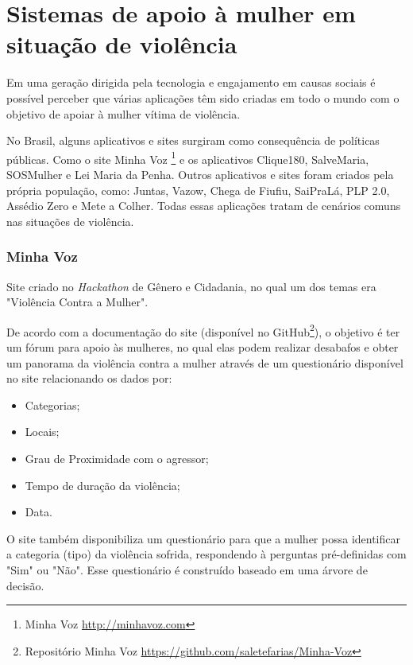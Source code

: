 \chapter{Sistemas de apoio à mulher em situação de violência} \label{cap:sistemas_relacionados}

Em uma geração dirigida pela tecnologia e engajamento em causas sociais é possível perceber que várias aplicações têm sido criadas em todo o mundo com o objetivo de apoiar à mulher vítima de violência.

No Brasil, alguns aplicativos e sites surgiram como consequência de políticas públicas. Como o site Minha Voz \footnote{Minha Voz \url{http://minhavoz.com}} e os aplicativos Clique180, SalveMaria, SOSMulher e Lei Maria da Penha. Outros aplicativos e sites foram criados pela própria população, como: Juntas, Vazow, Chega de Fiufiu, 
SaiPraLá, PLP 2.0, Assédio Zero e Mete a Colher. Todas essas aplicações tratam de cenários comuns nas situações de 
violência.

\subsection*{Minha Voz}

Site criado no \textit{Hackathon} de Gênero e Cidadania, no qual
um dos temas era "Violência Contra a Mulher". 

De acordo com a documentação do site (disponível no GitHub\footnote{Repositório Minha Voz \url{https://github.com/saletefarias/Minha-Voz}}), o objetivo é ter um fórum para apoio às mulheres, no qual elas podem
realizar desabafos e obter um panorama da violência contra a mulher através de um questionário
disponível no site relacionando os dados por:

\begin{itemize}
	\item Categorias;
	\item Locais;
	\item Grau de Proximidade com o agressor;
	\item Tempo de duração da violência;
	\item Data.
\end{itemize}

O site também disponibiliza um questionário para que a mulher possa identificar a categoria (tipo) da violência sofrida, respondendo à perguntas pré-definidas com "Sim" ou "Não". Esse questionário é construído baseado em uma árvore de decisão.

\vfill

